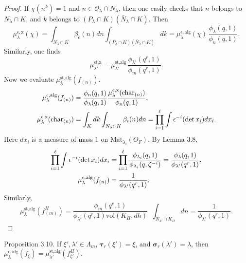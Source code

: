 \documentclass{amsart}
\begin{document}
\begin{proof}
If
  $ \chi (n^k) = 1 $ and $n\in {\mathcal O}_\lambda\cap N_\lambda$,
then one easily checks that
  $ n$ belongs to $N_{\lambda} \cap K $,
and
  $k$ belongs to  $(P_{\lambda} \cap K)
          (\bar N_{\lambda} \cap K) $.
Then 
%
$$
  \mu_{\lambda}^{\epsilon,\text{x}} (\chi) =
  \int_{N_{\lambda}\cap K}
  \beta_{\epsilon} (n) d n
  \int_{ (P_{\lambda}\cap K) 
         (\bar N_{\lambda}\cap K) }
  dk =
  \mu_{\lambda}^{\epsilon,\text{alg}} (\chi) \,
  \frac
    { \phi_\lambda(q,1)} {\phi_n(q,1)}.
$$
Similarly, one finds
%
$$
  \mu_{\lambda'}^{\text{st,x}} =
  \mu_{\lambda'}^{\text{st,alg}} \,
  \frac {\phi_{\lambda'}(q^r,1)} {\phi_m(q^r,1)}.
$$
Now we evaluate
  $ \mu_{\lambda}^{\text{st,alg}} (f_{(n)})$. 
%
\begin{align*}
 \mu_{\lambda}^{\epsilon,\text{alg}} (f_{(n)})
&=
  \frac {\phi_n(q,1)}{\phi_\lambda(q,1)}
  \frac
     {  \mu_{\lambda}^{\epsilon,\text{x}} (\text{char}_{(n)})  }
     {  \phi_n (q,1)  },  \\
\vspace{4pt}
  \mu_{\lambda}^{\epsilon,\text{x}} (\text{char}_{(n)})
&=
  \int_K dk 
  \int_{ N_{\lambda} \cap K }
  \beta_{\epsilon} (n)  d n =
  \prod_{i=1}^{\ell} 
  \int
  \epsilon^{-i}
  (\det x_i)
  d x_i.
\end{align*}
%
Here 
  $ d x_i $
is a measure of mass $1$ on
 $ \text{Mat}_{\lambda_i} (O_F) $. By Lemma 3.8,
%
\begin{align*}
  \prod_{i=1}^{\ell}
  \int
  \epsilon^{-i} (\det x_i)
  d x_i 
&=
  \prod_{i=1}^{\ell}
  \frac
     { \phi_{\lambda_i} (q,1)  }
     { \phi_{\lambda_i} (q,\zeta^{-i})  } 
= 
  \frac
     { \phi_{\lambda} (q,1)  }
     { \phi_{\lambda'} (q^r,1)  }. 
\\
\vspace{8pt}
  \mu_{\lambda}^{\epsilon,\text{alg} }
  (f_{(n)})
&=
  \frac{1} {\phi_{\lambda'}(q^r,1)}. 
\end{align*}
Similarly,
$$
  \mu_{\lambda}^{\text{st,alg}}
  (f_{(m)}^H)
=
  \frac 
  { \phi_m(q^r,1) } {\phi_{\lambda'}(q^r,1)
        \text{vol}(K_H, dh)   } \;\;
   \int_{  N_{\lambda'}\cap K_H }  
   d n
=
   \frac 1
       { \phi_{\lambda'} (q^r,1)   }.
$$
\end{proof}
\bigskip

\proclaim Proposition {3.10}.
If
  $ \xi', \lambda' \in \Lambda_m $,
  $ \pmb\tau_r (\xi') = \xi $, and
  $ \pmb\sigma_r (\lambda') = \lambda$,
then
  $ \mu_{\lambda}^{\epsilon,\text{alg}}
    (f_{\xi}) = \mu_{\lambda'}^{\text{st,alg}}
    (f_{\xi'}^H) $.
\finishproclaim
\end{document}
